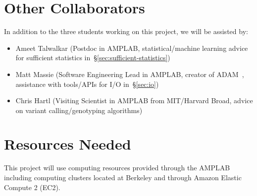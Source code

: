 \documentclass[11pt]{article}
\begin{document}
\appendix

\section{Other Collaborators}
\label{sec:other-collaborators}

In addition to the three students working on this project, we will be assisted by:

\begin{itemize}
\item Ameet Talwalkar (Postdoc in AMPLAB, statistical/machine learning advice for sufficient statistics in~\S\ref{sec:sufficient-statistics})
\item Matt Massie (Software Engineering Lead in AMPLAB, creator of ADAM~\cite{adam}, assistance with tools/APIs for I/O
in~\S\ref{sec:io})
\item Chris Hartl (Visiting Scientist in AMPLAB from MIT/Harvard Broad, advice on variant calling/genotyping algorithms)
\end{itemize}

\small

\section{Resources Needed}
\label{sec:resources-needed}

This project will use computing resources provided through the AMPLAB including computing clusters located at Berkeley and through
Amazon Elastic Compute 2 (EC2).




\end{document}
